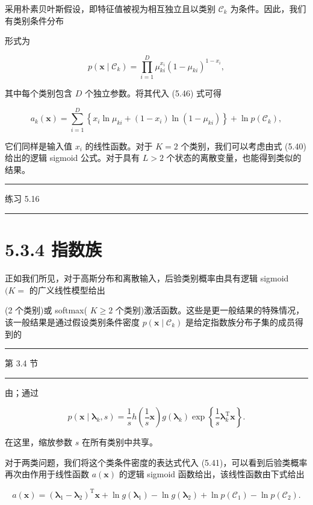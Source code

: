 \documentclass[10pt]{article}
\newcommand{\HRule}{\begin{center}\rule{0.9\linewidth}{0.2mm}\end{center}}
\begin{document}
采用朴素贝叶斯假设，即特征值被视为相互独立且以类别 \({\mathcal{C}}_{k}\) 为条件。因此，我们有类别条件分布

形式为

\[
p\left( {\mathbf{x} \mid  {\mathcal{C}}_{k}}\right)  = \mathop{\prod }\limits_{{i = 1}}^{D}{\mu }_{ki}^{{x}_{i}}{\left( 1 - {\mu }_{ki}\right) }^{1 - {x}_{i}}, \tag{5.64}
\]

其中每个类别包含 \(D\) 个独立参数。将其代入 (5.46) 式可得

\[
{a}_{k}\left( \mathbf{x}\right)  = \mathop{\sum }\limits_{{i = 1}}^{D}\left\{  {{x}_{i}\ln {\mu }_{ki} + \left( {1 - {x}_{i}}\right) \ln \left( {1 - {\mu }_{ki}}\right) }\right\}   + \ln p\left( {\mathcal{C}}_{k}\right) , \tag{5.65}
\]

它们同样是输入值 \({x}_{i}\) 的线性函数。对于 \(K = 2\) 个类别，我们可以考虑由式 (5.40) 给出的逻辑 sigmoid 公式。对于具有 \(L > 2\) 个状态的离散变量，也能得到类似的结果。

\HRule

练习 5.16

\HRule

\section*{5.3.4 指数族}

正如我们所见，对于高斯分布和离散输入，后验类别概率由具有逻辑 sigmoid \((K =\) 的广义线性模型给出

(2 个类别)或 softmax( \(K \geq  2\) 个类别)激活函数。这些是更一般结果的特殊情况，该一般结果是通过假设类别条件密度 \(p\left( {\mathbf{x} \mid  {\mathcal{C}}_{k}}\right)\) 是给定指数族分布子集的成员得到的

\HRule

第 3.4 节

\HRule

由；通过

\[
p\left( {\mathbf{x} \mid  {\mathbf{\lambda }}_{k},s}\right)  = \frac{1}{s}h\left( {\frac{1}{s}\mathbf{x}}\right) g\left( {\mathbf{\lambda }}_{k}\right) \exp \left\{  {\frac{1}{s}{\mathbf{\lambda }}_{k}^{\mathrm{T}}\mathbf{x}}\right\}  . \tag{5.66}
\]

在这里，缩放参数 \(s\) 在所有类别中共享。

对于两类问题，我们将这个类条件密度的表达式代入 (5.41)，可以看到后验类概率再次由作用于线性函数 \(a\left( \mathbf{x}\right)\) 的逻辑 sigmoid 函数给出，该线性函数由下式给出

\[
a\left( \mathbf{x}\right)  = {\left( {\mathbf{\lambda }}_{1} - {\mathbf{\lambda }}_{2}\right) }^{\mathrm{T}}\mathbf{x} + \ln g\left( {\mathbf{\lambda }}_{1}\right)  - \ln g\left( {\mathbf{\lambda }}_{2}\right)  + \ln p\left( {\mathcal{C}}_{1}\right)  - \ln p\left( {\mathcal{C}}_{2}\right) . \tag{5.67}
\]
\end{document}
